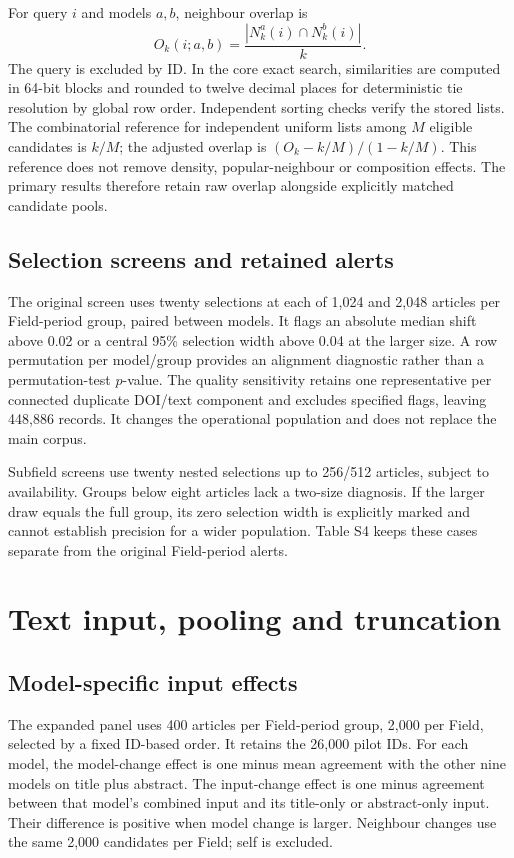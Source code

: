 \documentclass[12pt]{article}
\begin{document}
For query $i$ and models $a,b$, neighbour overlap is
\[
O_k(i;a,b)=\frac{|N_k^a(i)\cap N_k^b(i)|}{k}.
\]
The query is excluded by ID. In the core exact search, similarities are computed in 64-bit blocks and rounded to twelve decimal places for deterministic tie resolution by global row order. Independent sorting checks verify the stored lists. The combinatorial reference for independent uniform lists among $M$ eligible candidates is $k/M$; the adjusted overlap is $(O_k-k/M)/(1-k/M)$. This reference does not remove density, popular-neighbour or composition effects. The primary results therefore retain raw overlap alongside explicitly matched candidate pools.

\subsection{Selection screens and retained alerts}
The original screen uses twenty selections at each of 1,024 and 2,048 articles per Field-period group, paired between models. It flags an absolute median shift above 0.02 or a central 95\% selection width above 0.04 at the larger size. A row permutation per model/group provides an alignment diagnostic rather than a permutation-test $p$-value. The quality sensitivity retains one representative per connected duplicate DOI/text component and excludes specified flags, leaving 448,886 records. It changes the operational population and does not replace the main corpus.

Subfield screens use twenty nested selections up to 256/512 articles, subject to availability. Groups below eight articles lack a two-size diagnosis. If the larger draw equals the full group, its zero selection width is explicitly marked and cannot establish precision for a wider population. Table S4 keeps these cases separate from the original Field-period alerts.

\FloatBarrier

\section{Text input, pooling and truncation}
\subsection{Model-specific input effects}
The expanded panel uses 400 articles per Field-period group, 2,000 per Field, selected by a fixed ID-based order. It retains the 26,000 pilot IDs. For each model, the model-change effect is one minus mean agreement with the other nine models on title plus abstract. The input-change effect is one minus agreement between that model's combined input and its title-only or abstract-only input. Their difference is positive when model change is larger. Neighbour changes use the same 2,000 candidates per Field; self is excluded.
\end{document}
